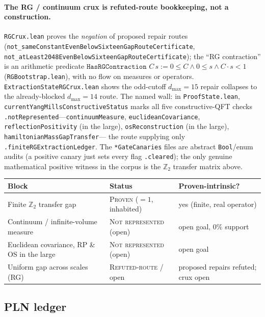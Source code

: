 \paragraph{The RG / continuum crux is refuted-route bookkeeping, not a
construction.} \texttt{RGCrux.lean} proves the \emph{negation} of proposed
repair routes
(\texttt{not\_sameConstantEvenBelowSixteenGapRouteCertificate},
\texttt{not\_atLeast2048EvenBelowSixteenGapRouteCertificate}); the ``RG
contraction'' is an arithmetic predicate
$\texttt{HasRGContraction }C\,s := 0\le C \wedge 0\le s \wedge C\cdot s<1$
(\texttt{RGBootstrap.lean}), with no flow on measures or operators.
\texttt{ExtractionStateRGCrux.lean} shows the odd-cutoff $d_{\max}=15$ repair
collapses to the already-blocked $d_{\max}=14$ route. The named wall: in
\texttt{ProofState.lean}, \texttt{currentYangMillsConstructiveStatus} marks all
five constructive-QFT checks \texttt{.notRepresented}---\texttt{continuumMeasure},
\texttt{euclideanCovariance}, \texttt{reflectionPositivity} (in the large),
\texttt{osReconstruction} (in the large), \texttt{hamiltonianMassGapTransfer}---
the route supplying only \texttt{.finiteRGExtractionLedger}. The
\texttt{*GateCanaries} files are abstract \texttt{Bool}/enum audits (a positive
canary just sets every flag \texttt{.cleared}); the only genuine mathematical
positive witness in the corpus is the $\mathbb{Z}_2$ transfer matrix above.

\begin{center}
\begin{tabular}{lll}
\hline
Block & Status & Proven-intrinsic? \\
\hline
Finite $\mathbb{Z}_2$ transfer gap & \textsc{Proven} ($=1$, inhabited) & yes (finite, real operator) \\
Continuum / infinite-volume measure & \textsc{Not represented} (open) & open goal, $0\%$ support \\
Euclidean covariance, RP \& OS in the large & \textsc{Not represented} (open) & open goal \\
Uniform gap across scales (RG) & \textsc{Refuted-route} / open & proposed repairs refuted; crux open \\
\hline
\end{tabular}
\end{center}

\subsection{PLN ledger}
\label{sec:ym-pln}

